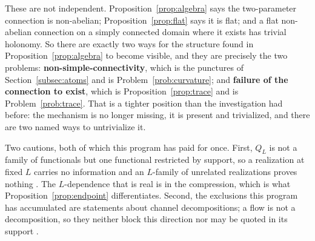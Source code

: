 These are not independent. Proposition~\ref{prop:algebra} says the two-parameter
connection is non-abelian; Proposition~\ref{prop:flat} says it is flat; and a flat
non-abelian connection on a simply connected domain where it exists has trivial
holonomy. So there are exactly two ways for the structure found in
Proposition~\ref{prop:algebra} to become visible, and they are precisely the two
problems: \textbf{non-simple-connectivity}, which is the punctures of
Section~\ref{subsec:atoms} and is Problem~\ref{prob:curvature}; and \textbf{failure
of the connection to exist}, which is Proposition~\ref{prop:trace} and is
Problem~\ref{prob:trace}. That is a tighter position than the investigation had
before: the mechanism is no longer missing, it is present and trivialized, and
there are two named ways to untrivialize it.

\begin{remark}\label{rem:not-a-family}
Two cautions, both of which this program has paid for once. First, $Q_L$ is not a
family of functionals but one functional restricted by support, so a realization
at fixed $L$ carries no information and an $L$-family of unrelated realizations
proves nothing \cite{InverseBulk}. The $L$-dependence that is real is in the
compression, which is what Proposition~\ref{prop:endpoint} differentiates.
Second, the exclusions this program has accumulated are statements about channel
decompositions; a flow is not a decomposition, so they neither block this
direction nor may be quoted in its support \cite{ExclusionMap}.
\end{remark}
